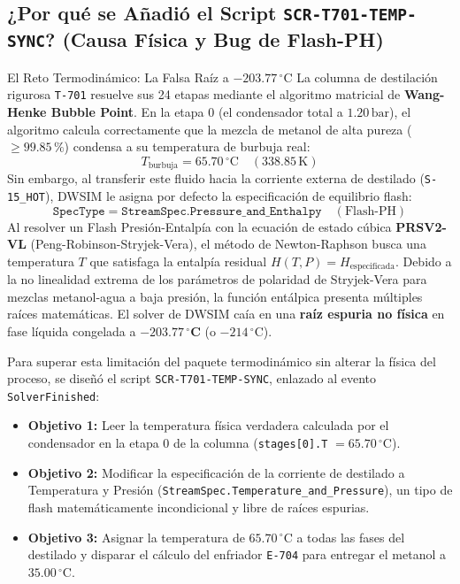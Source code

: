 \documentclass[11pt,a4paper]{article}
\begin{document}
\subsection{¿Por qué se Añadió el Script \texttt{SCR-T701-TEMP-SYNC}? (Causa Física y Bug de Flash-PH)}

\begin{pedagogico}{El Reto Termodinámico: La Falsa Raíz a $-203.77\,^\circ\text{C}$}
La columna de destilación rigurosa \texttt{T-701} resuelve sus 24 etapas mediante el algoritmo matricial de \textbf{Wang-Henke Bubble Point}. En la etapa 0 (el condensador total a $1.20\,\text{bar}$), el algoritmo calcula correctamente que la mezcla de metanol de alta pureza ($\ge 99.85\,\%$) condensa a su temperatura de burbuja real:
\begin{equation}
    T_{\text{burbuja}} = 65.70\,^\circ\text{C} \quad (338.85\,\text{K})
\end{equation}
Sin embargo, al transferir este fluido hacia la corriente externa de destilado (\texttt{S-15\_HOT}), DWSIM le asigna por defecto la especificación de equilibrio flash:
\begin{equation}
    \texttt{SpecType} = \texttt{StreamSpec.Pressure\_and\_Enthalpy} \quad (\text{Flash-PH})
\end{equation}
Al resolver un Flash Presión-Entalpía con la ecuación de estado cúbica \textbf{PRSV2-VL} (Peng-Robinson-Stryjek-Vera), el método de Newton-Raphson busca una temperatura $T$ que satisfaga la entalpía residual $H(T, P) = H_{\text{especificada}}$. Debido a la no linealidad extrema de los parámetros de polaridad de Stryjek-Vera para mezclas metanol-agua a baja presión, la función entálpica presenta múltiples raíces matemáticas. El solver de DWSIM caía en una \textbf{raíz espuria no física} en fase líquida congelada a $\mathbf{-203.77\,^\circ\text{C}}$ (o $-214\,^\circ\text{C}$).
\end{pedagogico}

Para superar esta limitación del paquete termodinámico sin alterar la física del proceso, se diseñó el script \texttt{SCR-T701-TEMP-SYNC}, enlazado al evento \texttt{SolverFinished}:
\begin{itemize}
    \item \textbf{Objetivo 1:} Leer la temperatura física verdadera calculada por el condensador en la etapa 0 de la columna (\texttt{stages[0].T} $= 65.70\,^\circ\text{C}$).
    \item \textbf{Objetivo 2:} Modificar la especificación de la corriente de destilado a Temperatura y Presión (\texttt{StreamSpec.Temperature\_and\_Pressure}), un tipo de flash matemáticamente incondicional y libre de raíces espurias.
    \item \textbf{Objetivo 3:} Asignar la temperatura de $65.70\,^\circ\text{C}$ a todas las fases del destilado y disparar el cálculo del enfriador \texttt{E-704} para entregar el metanol a $35.00\,^\circ\text{C}$.
\end{itemize}
\end{document}

